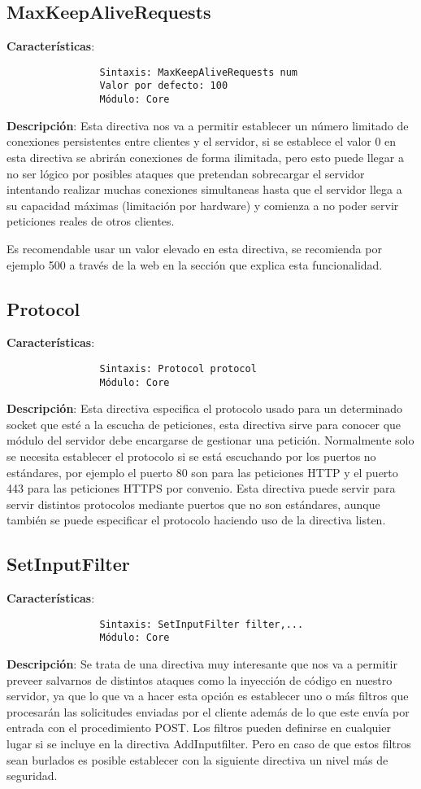 \documentclass[a4paper, 11pt]{article} %
\begin{document}
	\subsection{MaxKeepAliveRequests}
	\textbf{Características}:
	\begin{verbatim}
				Sintaxis: MaxKeepAliveRequests num
				Valor por defecto: 100
				Módulo: Core
	\end{verbatim}
	\textbf{Descripción}: Esta directiva nos va a permitir establecer un número limitado de conexiones persistentes entre clientes y el servidor, si se establece el valor 0 en esta directiva se abrirán conexiones de forma ilimitada, pero esto puede llegar a no ser lógico por posibles ataques que pretendan sobrecargar el servidor intentando realizar muchas conexiones simultaneas hasta que el servidor llega a su capacidad máximas (limitación por hardware) y comienza a no poder servir peticiones reales de otros clientes.
	
	Es recomendable usar un valor elevado en esta directiva, se recomienda por ejemplo 500 a través de la web \cite{url4} en la sección que explica esta funcionalidad.
	\subsection{Protocol}
	\textbf{Características}:
	\begin{verbatim}
				Sintaxis: Protocol protocol
				Módulo: Core
	\end{verbatim}
	\textbf{Descripción}: Esta directiva especifica el protocolo usado para un determinado socket que esté a la escucha de peticiones, esta directiva sirve para conocer que módulo del servidor debe encargarse de gestionar una petición. Normalmente solo se necesita establecer el protocolo  si se está escuchando por los puertos no estándares, por ejemplo el puerto 80 son para las peticiones HTTP y el puerto 443 para las peticiones HTTPS por convenio. Esta directiva puede servir para servir distintos protocolos mediante puertos que no son estándares, aunque también se puede especificar el protocolo haciendo uso de la directiva listen.
	\subsection{SetInputFilter}
	\textbf{Características}:
	\begin{verbatim}
				Sintaxis: SetInputFilter filter,...
				Módulo: Core
	\end{verbatim}
	\textbf{Descripción}: Se trata de una directiva muy interesante que nos va a permitir preveer salvarnos de distintos ataques como la inyección de código en nuestro servidor, ya que lo que va a hacer esta opción es establecer uno o más filtros que procesarán las solicitudes enviadas por el cliente además de lo que este envía por entrada con el procedimiento POST. Los filtros pueden definirse en cualquier lugar si se incluye en la directiva AddInputfilter. Pero en caso de que estos filtros sean burlados es posible establecer con la siguiente directiva un nivel más de seguridad.
\end{document}

